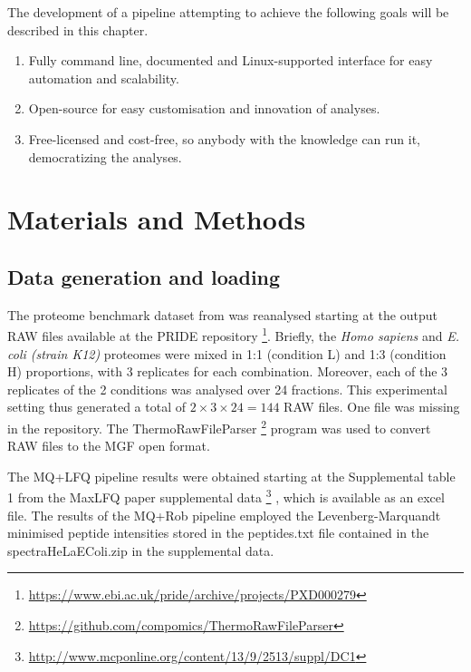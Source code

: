 \documentclass[11pt, a4paper]{report}
\begin{document}
The development of a pipeline attempting to achieve the following goals will be described in this chapter.

\begin{enumerate}

\item Fully command line, documented and Linux-supported interface for easy automation and scalability.
\item Open-source for easy customisation and innovation of analyses.
\item Free-licensed and cost-free, so anybody with the knowledge can run it, democratizing the analyses.
\end{enumerate}

\section{Materials and Methods}

\subsection{Data generation and loading}

The proteome benchmark dataset from \cite{Cox2014} was reanalysed starting at the output RAW files available at the PRIDE repository \footnote{\href{https://www.ebi.ac.uk/pride/archive/projects/PXD000279}{https://www.ebi.ac.uk/pride/archive/projects/PXD000279}}. Briefly, the \textit{Homo sapiens} and \textit{E. coli (strain K12)} proteomes were mixed in 1:1 (condition L) and 1:3 (condition H) proportions, with 3 replicates for each combination. Moreover, each of the 3 replicates of the 2 conditions was analysed over 24 fractions. This experimental setting thus generated a total of $2 \times 3 \times 24=144$ RAW files. One file was missing in the repository. The ThermoRawFileParser \footnote{\href{https://github.com/compomics/ThermoRawFileParser}{https://github.com/compomics/ThermoRawFileParser}} program was used to convert RAW files to the MGF open format.

The MQ+LFQ pipeline results were obtained starting at the Supplemental table 1 from the MaxLFQ paper supplemental data \footnote{\href{http://www.mcponline.org/content/13/9/2513/suppl/DC1}{http://www.mcponline.org/content/13/9/2513/suppl/DC1}} \cite{Cox2014}, which is available as an excel file. The results of the MQ+Rob pipeline employed the Levenberg-Marquandt minimised peptide intensities stored in the peptides.txt file contained in the spectraHeLaEColi.zip in the supplemental data.
\end{document}
